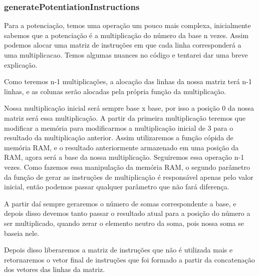 \documentclass{article}
\begin{document}
\subsubsection{generatePotentiationInstructions}

Para a potenciação, temos uma operação um pouco mais complexa, inicialmente sabemos que a potenciação é a multiplicação do número da base n vezes. Assim podemos alocar uma matriz de instruções
em que cada linha corresponderá a uma multiplicacao. Temos algumas nuances no código e tentarei dar uma breve explicação. 

Como teremos n-1 multiplicações, a alocação das linhas da nossa matriz terá n-1 linhas, e as colunas serão alocadas pela própria função da multiplicação.

Nossa multiplicação inicial será sempre base x base, por isso a posição 0 da nossa matriz será essa multiplicação. A partir da primeira multiplicação teremos que modificar a memória para modificarmos a multiplicação inicial de 3 para o resultado da multiplicação anterior.
Assim utilizaremos a função cópida de memória RAM, e o resultado anteriormente armazenado em uma posição da RAM, agora será a base da nossa multiplicação. Seguiremos essa operação n-1 vezes. Como fazemos essa manipulação da memória RAM, o segundo parâmetro da função de gerar as instruções de multiplicação é responsável apenas
pelo valor inicial, então podemos passar qualquer parâmetro que não fará diferença.

A partir daí sempre geraremos o número de somas correspondente a base, e depois disso devemos tanto passar o resultado atual para a posição do número a ser multiplicado, quando zerar o elemento neutro da soma, pois nossa soma se baseia nele.

Depois disso liberaremos a matriz de instruções que não é utilizada mais e retornaremos o vetor final de instruções que foi formado a partir da concatenação dos vetores das linhas da matriz.
\end{document}

